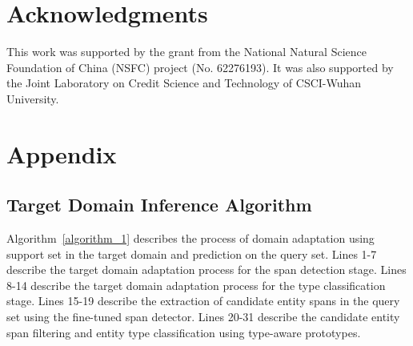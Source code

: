 \documentclass[11pt]{article}
\begin{document}
\section*{Acknowledgments}


This work was supported by the grant from the National Natural Science Foundation of China (NSFC) project (No. 62276193). It was also supported by the Joint Laboratory on Credit Science and Technology of CSCI-Wuhan University.




\clearpage

\appendix
\section{Appendix}

\subsection{Target Domain Inference Algorithm}\label{app:algorithm_1}

Algorithm~\ref{algorithm_1} describes the process of domain adaptation using support set in the target domain and prediction on the query set.
Lines 1-7 describe the target domain adaptation process for the span detection stage.
Lines 8-14 describe the target domain adaptation process for the type classification stage.
Lines 15-19 describe the extraction of candidate entity spans in the query set using the fine-tuned span detector.
Lines 20-31 describe the candidate entity span filtering and entity type classification using type-aware prototypes.


\renewcommand{\algorithmicensure}{\textbf{Output:}}
\end{document}
